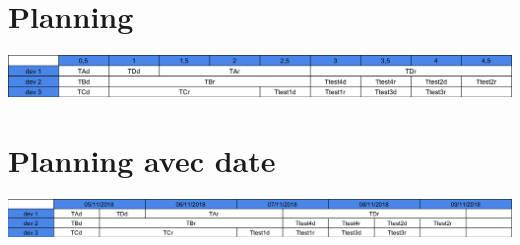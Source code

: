 \documentclass[french]{article}
\begin{document}
\section{Planning}
\includegraphics[scale=0.2]{rsc/planning_sprint1_nodate.png}

\section{Planning avec date}
\includegraphics[scale=0.18]{rsc/planning_sprint1_date.png}
\end{document}
